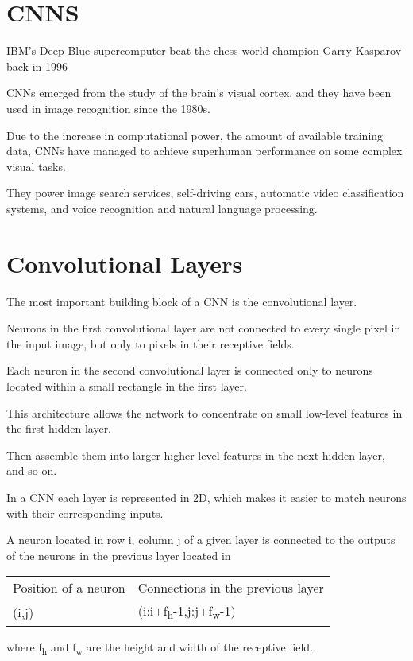 \documentclass[11pt]{article}
\author{aulw}
\date{\today}
\title{}
\begin{document}
\tableofcontents

\section{CNNS}
\label{sec:org6900061}
IBM’s Deep Blue supercomputer beat the chess world champion Garry Kasparov back in 1996

CNNs emerged from the study of the brain’s visual cortex, and they have been
used in image recognition since the 1980s. 

Due to the increase in computational power, the amount of available training
data, CNNs have managed to achieve superhuman performance on some complex visual tasks. 

They power image search services, self-driving cars, automatic video classification
systems, and voice recognition and natural language processing. 

\section{Convolutional Layers}
\label{sec:orgbe238a5}
The most important building block of a CNN is the convolutional layer.

Neurons in the first convolutional layer are not connected to every single
pixel in the input image, but only to pixels in their receptive fields. 

Each neuron in the second convolutional layer is connected only to
neurons located within a small rectangle in the first layer. 

This architecture allows the network to concentrate on small low-level features
in the first hidden layer. 

Then assemble them into larger higher-level features in the next hidden layer, and so on. 

In a CNN each layer is represented in 2D, which makes it easier to match neurons
with their corresponding inputs.

A neuron located in row i, column j of a given layer 
is connected to the outputs of the neurons in the previous layer located in 
\begin{center}
\begin{tabular}{ll}
Position of a neuron & Connections in the previous layer\\
(i,j) & (i:i+f\textsubscript{h}-1,j:j+f\textsubscript{w}-1)\\
\end{tabular}
\end{center}
where f\textsubscript{h} and f\textsubscript{w} are the height and width of the receptive field. 
\end{document}
